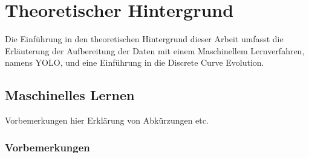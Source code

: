 \chapter{Theoretischer Hintergrund}
\label{ch:Theoretischer Hintergrund}
{Die Einführung in den theoretischen Hintergrund dieser Arbeit umfasst die Erläuterung der Aufbereitung der Daten mit einem Maschinellem Lernverfahren, namens YOLO, und eine Einführung in die \glqq Discrete Curve Evolution\grqq{}.
}



\section{Maschinelles Lernen}
{	Vorbemerkungen hier Erklärung von Abkürzungen etc.
	\subsection{Vorbemerkungen}
}
